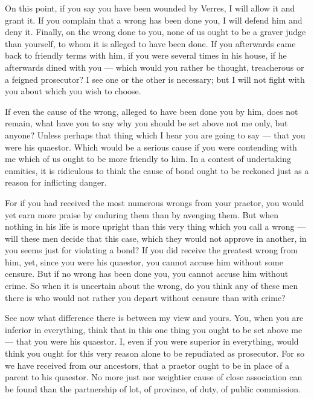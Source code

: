  On this point, if you say you have been wounded by Verres, I will allow it and grant it. If you complain that a wrong has been done you, I will defend him and deny it. Finally, on the wrong done to you, none of us ought to be a graver judge than yourself, to whom it is alleged to have been done. If you afterwards came back to friendly terms with him, if you were several times in his house, if he afterwards dined with you --- which would you rather be thought, treacherous or a feigned prosecutor? I see one or the other is necessary; but I will not fight with you about which you wish to choose.

 If even the cause of the wrong, alleged to have been done you by him, does not remain, what have you to say why you should be set above not me only, but anyone? Unless perhaps that thing which I hear you are going to say --- that you were his quaestor. Which would be a serious cause if you were contending with me which of us ought to be more friendly to him. In a contest of undertaking enmities, it is ridiculous to think the cause of bond ought to be reckoned just as a reason for inflicting danger.

 For if you had received the most numerous wrongs from your praetor, you would yet earn more praise by enduring them than by avenging them. But when nothing in his life is more upright than this very thing which you call a wrong --- will these men decide that this case, which they would not approve in another, in you seems just for violating a bond? If you did receive the greatest wrong from him, yet, since you were his quaestor, you cannot accuse him without some censure. But if no wrong has been done you, you cannot accuse him without crime. So when it is uncertain about the wrong, do you think any of these men there is who would not rather you depart without censure than with crime?

 See now what difference there is between my view and yours. You, when you are inferior in everything, think that in this one thing you ought to be set above me --- that you were his quaestor. I, even if you were superior in everything, would think you ought for this very reason alone to be repudiated as prosecutor. For so we have received from our ancestors, that a praetor ought to be in place of a parent to his quaestor. No more just nor weightier cause of close association can be found than the partnership of lot, of province, of duty, of public commission.

